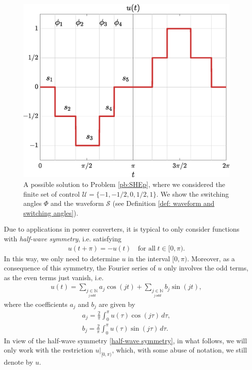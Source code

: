 \documentclass[twocolumn]{autart}    %
\begin{document}
\begin{figure}[h]
	\centering
	\includegraphics[scale=0.35]{img/fig01.eps} 
	\caption{A possible solution to Problem \ref{pb:SHEp}, where we considered the finite set of control $\mathcal{U} = \{-1, -1/2, 0, 1/2, 1\}$. We show the switching angles $\Phi$ and the waveform $\mathcal{S}$ (see Definition \ref{def: waveform and switching angles}).}
	\label{fig:exampleSHE}
\end{figure}
Due to applications in power converters,  it is typical to only consider functions with \textit{half-wave symmetry}, i.e. satisfying
\begin{align}\label{half-wave symmetry}
	u(t + \pi) = -u(t)\quad \mbox{for all}\; t \in [0,\pi).
\end{align}
In this way, we only need to determine $u$ in the interval $[0,\pi)$. Moreover, as a consequence of this symmetry, the Fourier series of $u$ only involves the odd terms, as the even terms just vanish, i.e.
\begin{align*}
	u(t) = \sum_{\underset{j\, odd}{j \in \mathbb{N}}} a_j \cos(jt)+ \sum_{\underset{j\, odd}{j \in \mathbb{N}}}  b_j \sin(jt),
\end{align*}
where the coefficients $a_j$ and $b_j$ are given by
\begin{equation} \label{eq:an}
	\begin{aligned}
		a_j = \frac{2}{\pi} \int_0^\pi u(\tau ) \cos(j \tau)\,d\tau, 
		\\[5pt]
		b_j = \frac{2}{\pi} \int_0^\pi u(\tau)  \sin(j \tau)\,d\tau.
	\end{aligned}
\end{equation}
In view of the half-wave symmetry \eqref{half-wave symmetry}, in what follows, we will only work with the restriction $u|_{[0,\pi)}$, which, with some abuse of notation, we still denote by $u$. 
\end{document}
